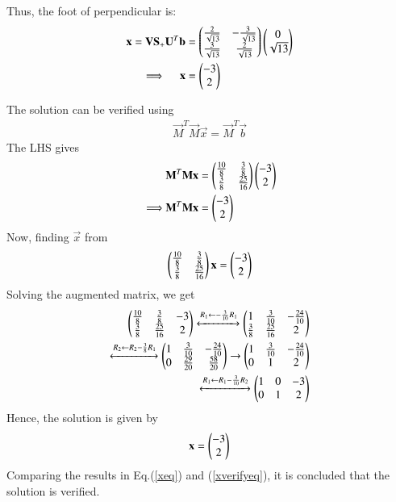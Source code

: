 \documentclass[journal,12pt,twocolumn]{IEEEtran}
\begin{document}
Thus, the foot of perpendicular is:
\begin{align}
\vec{x} = \vec{V}\vec{S}_{+}\vec{U}^T\vec{b} 
	&= \myvec{\frac{2}{\sqrt{13}} & -\frac{3}{\sqrt{13}} \\
		\frac{3}{\sqrt{13}} & \frac{2}{\sqrt{13}} }
	  \myvec{ 0 \\ \sqrt{13} }
	\\
	\implies \quad
\vec{x} &= \myvec{ -3 \\ 2 }  	\label{xeq}
\end{align}

The solution can be verified using
\begin{align}
	\vec{M}^T\vec{M}\vec{x} = \vec{M}^T\vec{b}
\end{align}
The LHS gives
\begin{align}
	& \mathbf{M}^T\mathbf{M}\mathbf{x} 
	= \begin{pmatrix}\frac{10}{8} & \frac{3}{8} \\ \frac{3}{8} & \frac{25}{16} \end{pmatrix}
	\begin{pmatrix}-3 \\ 2\end{pmatrix} \\
	\implies
	& \mathbf{M}^T\mathbf{M}\mathbf{x} = \begin{pmatrix}-3 \\ 2\end{pmatrix} 
\end{align}
Now, finding $\vec{x}$ from 
\begin{align}
	\begin{pmatrix}\frac{10}{8} & \frac{3}{8} \\ \frac{3}{8} & \frac{25}{16} \end{pmatrix}
	\mathbf{x} = \begin{pmatrix}-3 \\ 2\end{pmatrix} 
\end{align}
Solving the augmented matrix, we get
\begin{align}
     \begin{pmatrix}\frac{10}{8} & \frac{3}{8} & -3 \\ \frac{3}{8} & \frac{25}{16} & 2\end{pmatrix}
	\xleftrightarrow[]{R_1 \leftarrow -\frac{3}{10}R_1}
     \begin{pmatrix}1 & \frac{3}{10} &-\frac{24}{10} \\ \frac{3}{8} & \frac{25}{16} & 2\end{pmatrix}
	\\
	\xleftrightarrow[]{R_2 \leftarrow R_2-\frac{3}{8}R_1}
	\begin{pmatrix}1 & \frac{3}{10} &-\frac{24}{10} \\ 
		0 & \frac{29}{20} & \frac{58}{20} \end{pmatrix}
	\rightarrow \begin{pmatrix}1 & \frac{3}{10} &-\frac{24}{10} \\ 0 & 1 & 2 \end{pmatrix} \\
	\xleftrightarrow[]{R_1 \leftarrow R_1-\frac{3}{10}R_2}
	\begin{pmatrix}1 & 0 & -3 \\ 0 & 1 & 2\end{pmatrix}
\end{align}
Hence, the solution is given by
\begin{align}
	\vec{x} = \myvec{ -3 \\ 2 } 	\label{xverifyeq}
\end{align}
Comparing the results in Eq.(\ref{xeq}) and (\ref{xverifyeq}), it is
concluded that the solution is verified.
\end{document}
